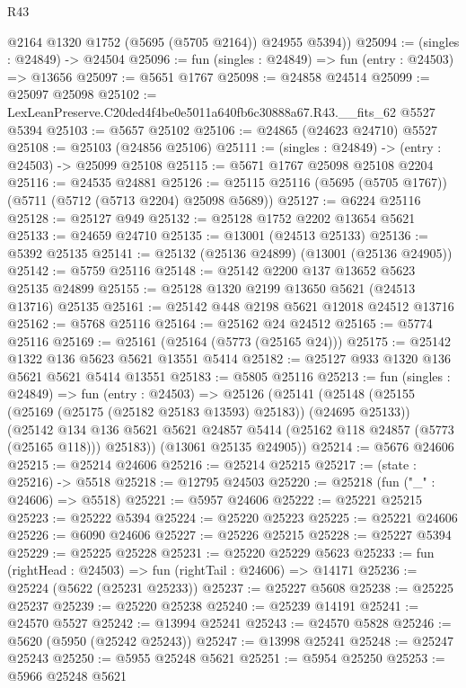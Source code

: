 \begin{lexlean}{R43}
\begin{coremodule}
        @2164
        @1320
        @1752
        (@5695 (@5705 @2164))
        @24955
        @5394))
@25094 := (singles : @24849) -> @24504
@25096 := fun (singles : @24849) => fun (entry : @24503) => @13656
@25097 := @5651 @1767
@25098 := @24858 @24514
@25099 := @25097 @25098
@25102 := LexLeanPreserve.C20ded4f4be0e5011a640fb6c30888a67.R43.__fits_62 @5527 @5394
@25103 := @5657 @25102
@25106 := @24865 (@24623 @24710) @5527
@25108 := @25103 (@24856 @25106)
@25111 := (singles : @24849) -> (entry : @24503) -> @25099 @25108
@25115 := @5671 @1767 @25098 @25108 @2204
@25116 := @24535 @24881
@25126 := @25115 @25116 (@5695 (@5705 @1767)) (@5711 (@5712 (@5713 @2204) @25098 @5689))
@25127 := @6224 @25116
@25128 := @25127 @949
@25132 := @25128 @1752 @2202 @13654 @5621
@25133 := @24659 @24710
@25135 := @13001 (@24513 @25133)
@25136 := @5392 @25135
@25141 := @25132 (@25136 @24899) (@13001 (@25136 @24905))
@25142 := @5759 @25116
@25148 := @25142 @2200 @137 @13652 @5623 @25135 @24899
@25155 := @25128 @1320 @2199 @13650 @5621 (@24513 @13716) @25135
@25161 := @25142 @448 @2198 @5621 @12018 @24512 @13716
@25162 := @5768 @25116
@25164 := @25162 @24 @24512
@25165 := @5774 @25116
@25169 := @25161 (@25164 (@5773 (@25165 @24)))
@25175 := @25142 @1322 @136 @5623 @5621 @13551 @5414
@25182 := @25127 @933 @1320 @136 @5621 @5621 @5414 @13551
@25183 := @5805 @25116
@25213 := fun (singles : @24849) =>
  fun (entry : @24503) =>
  @25126
    (@25141
      (@25148
        (@25155 (@25169 (@25175 (@25182 @25183 @13593) @25183)) (@24695 @25133))
        (@25142
          @134
          @136
          @5621
          @5621
          @24857
          @5414
          (@25162 @118 @24857 (@5773 (@25165 @118)))
          @25183))
      (@13061 @25135 @24905))
@25214 := @5676 @24606
@25215 := @25214 @24606
@25216 := @25214 @25215
@25217 := (state : @25216) -> @5518
@25218 := @12795 @24503
@25220 := @25218 (fun ("_" : @24606) => @5518)
@25221 := @5957 @24606
@25222 := @25221 @25215
@25223 := @25222 @5394
@25224 := @25220 @25223
@25225 := @25221 @24606
@25226 := @6090 @24606
@25227 := @25226 @25215
@25228 := @25227 @5394
@25229 := @25225 @25228
@25231 := @25220 @25229 @5623
@25233 := fun (rightHead : @24503) => fun (rightTail : @24606) => @14171
@25236 := @25224 (@5622 (@25231 @25233))
@25237 := @25227 @5608
@25238 := @25225 @25237
@25239 := @25220 @25238
@25240 := @25239 @14191
@25241 := @24570 @5527
@25242 := @13994 @25241
@25243 := @24570 @5828
@25246 := @5620 (@5950 (@25242 @25243))
@25247 := @13998 @25241
@25248 := @25247 @25243
@25250 := @5955 @25248 @5621
@25251 := @5954 @25250
@25253 := @5966 @25248 @5621

\end{coremodule}
\end{lexlean}
